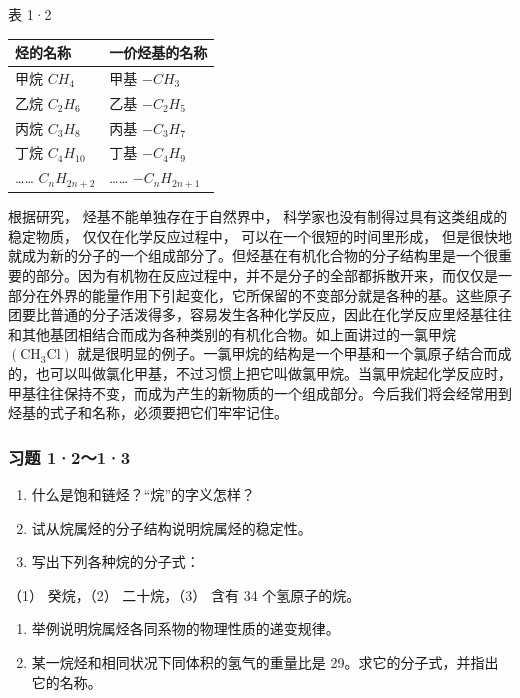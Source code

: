 表 1·2

{\def\LTcaptype{none} %
\begin{longtable}[]{@{}ll@{}}
\toprule\noalign{}
烃的名称 & 一价烃基的名称 \\
\midrule\noalign{}
\endhead
\bottomrule\noalign{}
\endlastfoot
甲烷 \(CH_4\) & 甲基 \(-CH_3\) \\
乙烷 \(C_2H_6\) & 乙基 \(-C_2H_5\) \\
丙烷 \(C_3H_8\) & 丙基 \(-C_3H_7\) \\
丁烷 \(C_4H_{10}\) & 丁基 \(-C_4H_9\) \\
\ldots\ldots{} \(C_{n}H_{2n+2}\) & \ldots\ldots{} \(-C_{n}H_{2n+1}\) \\
\end{longtable}
}

根据研究， 烃基不能单独存在于自然界中，
科学家也没有制得过具有这类组成的稳定物质， 仅仅在化学反应过程中，
可以在一个很短的时间里形成，
但是很快地就成为新的分子的一个组成部分了。但烃基在有机化合物的分子结构里是一个很重要的部分。因为有机物在反应过程中，并不是分子的全部都拆散开来，而仅仅是一部分在外界的能量作用下引起变化，它所保留的不变部分就是各种的基。这些原子团要比普通的分子活泼得多，容易发生各种化学反应，因此在化学反应里烃基往往和其他基团相结合而成为各种类别的有机化合物。如上面讲过的一氯甲烷
\(\left(\mathrm{CH}_{3}\mathrm{Cl}\right)\)
就是很明显的例子。一氯甲烷的结构是一个甲基和一个氯原子结合而成的，也可以叫做氯化甲基，不过习惯上把它叫做氯甲烷。当氯甲烷起化学反应时，甲基往往保持不变，而成为产生的新物质的一个组成部分。今后我们将会经常用到烃基的式子和名称，必须要把它们牢牢记住。

\subsubsection{习题 1·2～1·3}

\begin{enumerate}
\item
  什么是饱和链烃？``烷''的字义怎样？
\item
  试从烷属烃的分子结构说明烷属烃的稳定性。
\item
  写出下列各种烷的分子式：
\end{enumerate}

（1） 癸烷，（2） 二十烷，（3） 含有 34 个氢原子的烷。

\begin{enumerate}[start=4]
\item
  举例说明烷属烃各同系物的物理性质的递变规律。
\item
  某一烷烃和相同状况下同体积的氢气的重量比是
  29。求它的分子式，并指出它的名称。
\end{enumerate}

